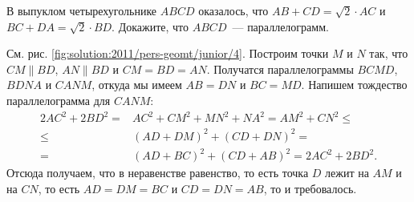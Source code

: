 В выпуклом четырехугольнике $ABCD$ оказалось, что
$AB + CD = \sqrt{2} \cdot AC$
и
$BC + DA = \sqrt{2} \cdot BD$.
Докажите, что $ABCD$~--- параллелограмм.


%
\label{solution:2011/pers-geomt/junior/4}%
См. рис. \ref{fig:solution:2011/pers-geomt/junior/4}.
Построим точки $M$ и $N$ так, что
$CM \parallel BD$, $AN \parallel BD$ и $CM = BD = AN$.
Получатся параллелограммы $BCMD$, $BDNA$ и $CANM$, откуда мы
имеем $AB = DN$ и $BC = MD$.
Напишем тождество параллелограмма для $CANM$:
\begin{align*}
    2 AC^2 + 2 BD^2
={}&
    AC^2 + CM^2 + MN^2 + NA^2
=
    AM^2 + CN^2
\leq\\\leq{}&
    (AD + DM)^2 + (CD + DN)^2
=\\={}&
    (AD + BC)^2 + (CD + AB)^2
=
    2 AC^2 + 2 BD^2
.\end{align*}
Отсюда получаем, что в неравенстве равенство, то есть точка $D$ лежит на
$AM$ и на $CN$, то есть $AD = DM = BC$ и $CD = DN = AB$, то и требовалось.

